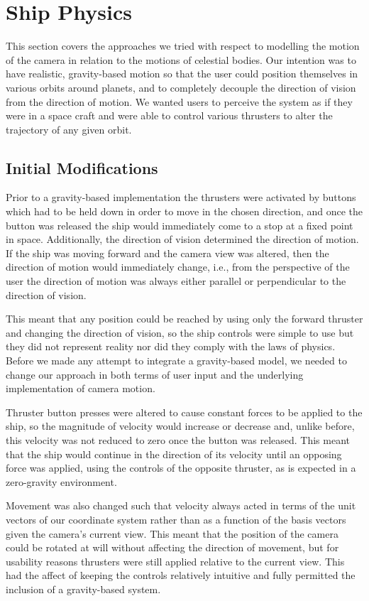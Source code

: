 \section{Ship Physics}
This section covers the approaches we tried with respect to modelling the motion of the camera in relation to the motions of celestial bodies.  Our intention was to have realistic, gravity-based motion so that the user could position themselves in various orbits around planets, and to completely decouple the direction of vision from the direction of motion.  We wanted users to perceive the system as if they were in a space craft and were able to control various thrusters to alter the trajectory of any given orbit.

\subsection{Initial Modifications}
Prior to a gravity-based implementation the thrusters were activated by buttons which had to be held down in order to move in the chosen direction, and once the button was released the ship would immediately come to a stop at a fixed point in space.  Additionally, the direction of vision determined the direction of motion.  If the ship was moving forward and the camera view was altered, then the direction of motion would immediately change, i.e., from the perspective of the user the direction of motion was always either parallel or perpendicular to the direction of vision.
 
This meant that any position could be reached by using only the forward thruster and changing the direction of vision, so the ship controls were simple to use but they did not represent reality nor did they comply with the laws of physics.  Before we made any attempt to integrate a gravity-based model, we needed to change our approach in both terms of user input and the underlying implementation of camera motion.

Thruster button presses were altered to cause constant forces to be applied to the ship, so the magnitude of velocity would increase or decrease and, unlike before, this velocity was not reduced to zero once the button was released.  This meant that the ship would continue in the direction of its velocity until an opposing force was applied, using the controls of the opposite thruster, as is expected in a zero-gravity environment.

Movement was also changed such that velocity always acted in terms of the unit vectors of our coordinate system rather than as a function of the basis vectors given the camera's current view.  This meant that the position of the camera could be rotated at will without affecting the direction of movement, but for usability reasons thrusters were still applied relative to the current view.  This had the affect of keeping the controls relatively intuitive and fully permitted the inclusion of a gravity-based system.

